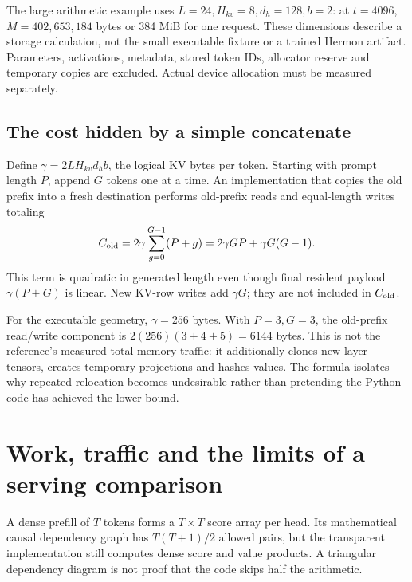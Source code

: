 \begin{center}\end{center}

The large arithmetic example uses $L=24,H_{kv}=8,d_h=128,b=2$:
at $t=4096$, $M=402{,}653{,}184$ bytes or 384 MiB for one request.
These dimensions describe a storage calculation, not the small executable
fixture or a trained Hermon artifact. Parameters, activations, metadata,
stored token IDs, allocator reserve and temporary copies are excluded.
Actual device allocation must be measured separately.

\subsection{The cost hidden by a simple concatenate}
Define $\gamma=2LH_{kv}d_hb$, the logical KV bytes per token. Starting with
prompt length $P$, append $G$ tokens one at a time. An implementation that
copies the old prefix into a fresh destination performs old-prefix reads and
equal-length writes totaling
\[
 C_{\rm old}
 =2\gamma\sum_{g=0}^{G-1}(P+g)
 =2\gamma GP+\gamma G(G-1).
\]
This term is quadratic in generated length even though final resident payload
$\gamma(P+G)$ is linear. New KV-row writes add $\gamma G$; they are not
included in $C_{\rm old}$.

For the executable geometry, $\gamma=256$ bytes. With $P=3,G=3$, the
old-prefix read/write component is $2(256)(3+4+5)=6144$ bytes. This is not
the reference's measured total memory traffic: it additionally clones new
layer tensors, creates temporary projections and hashes values. The formula
isolates why repeated relocation becomes undesirable rather than pretending
the Python code has achieved the lower bound.

\section{Work, traffic and the limits of a serving comparison}
\label{evod35:work}
A dense prefill of $T$ tokens forms a $T\times T$ score array per head.
Its mathematical causal dependency graph has $T(T+1)/2$ allowed pairs, but
the transparent implementation still computes dense score and value
products. A triangular dependency diagram is not proof that the code
skips half the arithmetic.

